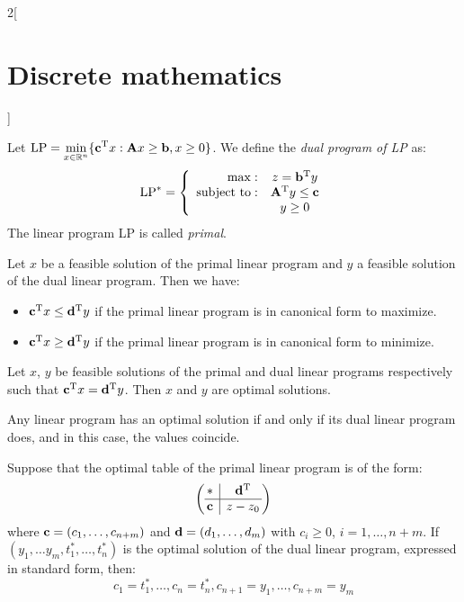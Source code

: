 \documentclass[../../../main.tex]{subfiles}
\begin{document}
\begin{multicols}{2}[\section{Discrete mathematics}]
    \begin{definition}
        Let $\text{LP}=\displaystyle\min_{x\in\mathbb{R} ^n}\{\vb{c}^{\mathrm{T}}x:\boldsymbol{\mathrm{A}}x\geq \boldsymbol{\mathrm{b}},x\geq 0\}$. We define the \textit{dual program of LP} as: $$\text{LP}^*=\left\{
            \begin{array}{rc}
                \max:              & z=\vb{b}^{\mathrm{T}}y          \\
                \text{subject to}: & \vb{A}^{\mathrm{T}}y\leq \boldsymbol{\mathrm{c}} \\
                                   & y\geq 0
            \end{array}\right.$$ The linear program LP is called \textit{primal}.
    \end{definition}
    \begin{theorem}
        Let $x$ be a feasible solution of the primal linear program and $y$ a feasible solution of the dual linear program. Then we have:
        \begin{itemize}
            \item $\vb{c}^{\mathrm{T}}x\leq \vb{d}^{\mathrm{T}}y$ if the primal linear program is in canonical form to maximize.
            \item $\vb{c}^{\mathrm{T}}x\geq \vb{d}^{\mathrm{T}}y$ if the primal linear program is in canonical form to minimize.
        \end{itemize}
    \end{theorem}
    \begin{corollary}
        Let $x$, $y$ be feasible solutions of the primal and dual linear programs respectively such that $\vb{c}^{\mathrm{T}}x=\vb{d}^{\mathrm{T}}y$. Then $x$ and $y$ are optimal solutions.
    \end{corollary}
    \begin{theorem}
        Any linear program has an optimal solution if and only if its dual linear program does, and in this case, the values coincide.
    \end{theorem}
    \begin{theorem}
        Suppose that the optimal table of the primal linear program is of the form:
        $$\left(
            \begin{array}{@{\,} c|c @{\,}}
                    *      & \transpose{d} \\
                    \hline
                    \vf{c} & z-z_0         \\
                \end{array}\right)$$ where $\boldsymbol{\mathrm{c}}=(c_1,\ldots,c_{n+m})$ and $\boldsymbol{\mathrm{d}}=(d_1,\ldots,d_m)$ with $c_i\geq0$, $i=1,\ldots,n+m$. If $(y_1,\ldots y_m,t_1^*,\ldots,t_n^*)$ is the optimal solution of the dual linear program, expressed in standard form, then: $$c_1=t_1^*,\ldots,c_n=t_n^*, c_{n+1}=y_1,\ldots,c_{n+m}=y_m$$
    \end{theorem}
\end{multicols}
\end{document}
